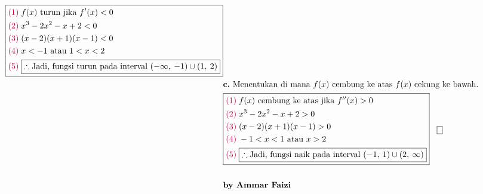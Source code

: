 \documentclass[13pt]{article}
\begin{document}
\begin{fleqn}[4em]
\begin{align*}
{\begin{aligned}
{\begin{aligned}
{    }
  \end{aligned}}\;~\;
    \boxed{\begin{aligned}
    & {\color{purple}(1)}\; f(x) \text{ turun jika } f'(x) < 0 \\
    & {\color{purple}(2)}\; x^3 - 2x^2 - x + 2 < 0 \\
    & {\color{purple}(3)}\; (x - 2)(x + 1)(x - 1) < 0 \\
    & {\color{purple}(4)}\; x<-1\text{ atau }1<x<2 \\
    & {\color{purple}(5)}\; \boxed{
      \therefore \text{Jadi, fungsi turun pada interval } (-\infty,\:-1)\cup (1,\:2)
    }
    \end{aligned}} \\
  & \textbf{c.} \text{ Menentukan di mana } f(x) \text{ cembung ke atas } f(x) \text{ cekung ke bawah.} \\
  & \boxed{\begin{aligned}
    & {\color{purple}(1)}\; f(x) \text{ cembung ke atas jika } f''(x) > 0 \\
    & {\color{purple}(2)}\; x^3 - 2x^2 - x + 2 > 0 \\
    & {\color{purple}(3)}\; (x - 2)(x + 1)(x - 1) > 0 \\
    & {\color{purple}(4)}\; -1<x<1\text{ atau }x>2 \\
    & {\color{purple}(5)}\; \boxed{
      \therefore \text{Jadi, fungsi naik pada interval } (-1,\:1)\cup (2,\:\infty)
    }
  \end{aligned}}\;~\;
    \boxed{\begin{aligned}
    \end{aligned}} \\
  \\ & \textbf{by Ammar Faizi}
\end{aligned}}
\end{align*}

\end{fleqn}
\end{document}

